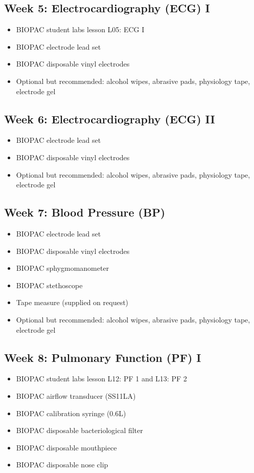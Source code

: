 \documentclass{article}
\begin{document}
\subsection*{Week 5: Electrocardiography (ECG) I}
\begin{itemize}
	\item BIOPAC student labs lesson L05: ECG I
	\item BIOPAC electrode lead set
	\item BIOPAC disposable vinyl electrodes
	\item Optional but recommended: alcohol wipes, abrasive pads, physiology tape, electrode gel
\end{itemize}

\subsection*{Week 6: Electrocardiography (ECG) II}
\begin{itemize}
	\item BIOPAC electrode lead set
	\item BIOPAC disposable vinyl electrodes
	\item Optional but recommended: alcohol wipes, abrasive pads, physiology tape, electrode gel
\end{itemize}

\subsection*{Week 7: Blood Pressure (BP)}
\begin{itemize}
	\item BIOPAC electrode lead set
	\item BIOPAC disposable vinyl electrodes
	\item BIOPAC sphygmomanometer
	\item BIOPAC stethoscope
	\item Tape measure (supplied on request)
	\item Optional but recommended: alcohol wipes, abrasive pads, physiology tape, electrode gel
\end{itemize}

\subsection*{Week 8: Pulmonary Function (PF) I}
\begin{itemize}
	\item BIOPAC student labs lesson L12: PF 1 and L13: PF 2
	\item BIOPAC airflow transducer (SS11LA)
	\item BIOPAC calibration syringe (0.6L)
	\item BIOPAC disposable bacteriological filter
	\item BIOPAC disposable mouthpiece
	\item BIOPAC disposable nose clip
\end{itemize}
\end{document}
